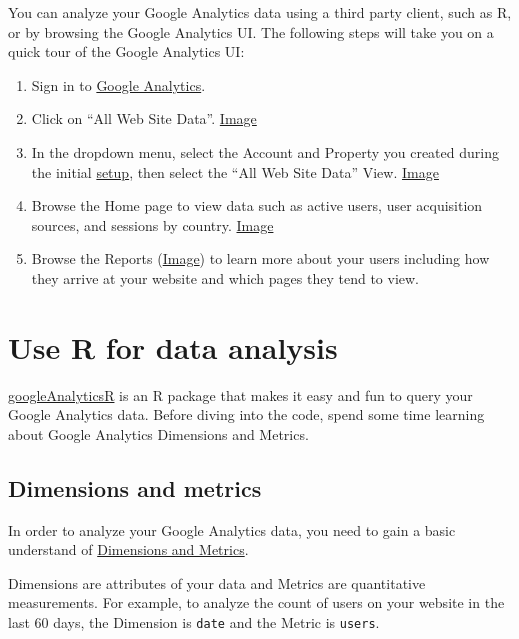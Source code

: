 \documentclass[
]{book}
\begin{document}
You can analyze your Google Analytics data using a third party client, such as R, or by browsing the Google Analytics UI. The following steps will take you on a quick tour of the Google Analytics UI:

\begin{enumerate}
\def\labelenumi{\arabic{enumi}.}
\item
  Sign in to \href{https://analytics.google.com/}{Google Analytics}.
\item
  Click on ``All Web Site Data''. \href{https://i.imgur.com/lyNPi8E.png}{Image}
\item
  In the dropdown menu, select the Account and Property you created during the initial \protect\hyperlink{ga-setup}{setup}, then select the ``All Web Site Data'' View. \href{https://i.imgur.com/xSjCS75.png}{Image}
\item
  Browse the Home page to view data such as active users, user acquisition sources, and sessions by country. \href{https://i.imgur.com/2u2mCey.png}{Image}
\item
  Browse the Reports (\href{https://i.imgur.com/3vvGhD0.png}{Image}) to learn more about your users including how they arrive at your website and which pages they tend to view.
\end{enumerate}

\hypertarget{use-r-for-data-analysis}{%
\section{Use R for data analysis}\label{use-r-for-data-analysis}}

\href{https://code.markedmondson.me/googleAnalyticsR/}{googleAnalyticsR} is an R package that makes it easy and fun to query your Google Analytics data. Before diving into the code, spend some time learning about Google Analytics Dimensions and Metrics.

\hypertarget{dimensions-and-metrics}{%
\subsection{Dimensions and metrics}\label{dimensions-and-metrics}}

In order to analyze your Google Analytics data, you need to gain a basic understand of \href{https://support.google.com/analytics/answer/1033861?hl=en}{Dimensions and Metrics}.

Dimensions are attributes of your data and Metrics are quantitative measurements. For example, to analyze the count of users on your website in the last 60 days, the Dimension is \texttt{date} and the Metric is \texttt{users}.
\end{document}
